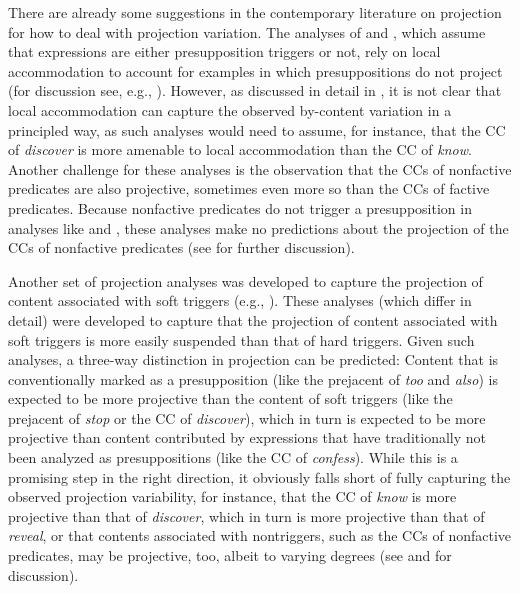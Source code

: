 \documentclass[11pt,fleqn]{article}
\newcommand{\6}{\mbox{$[\hspace*{-.6mm}[$}}
\newcommand{\9}{\mbox{$]\hspace*{-.6mm}]$}}
\begin{document}
There are already some suggestions in the contemporary literature on projection for how to deal with projection variation. The analyses of \citealt{heim83} and \citealt{vds92}, which assume that expressions are either presupposition triggers or not, rely on local accommodation to account for examples in which presuppositions do not project (for discussion see, e.g., \citealt{djaerv-bacovcin2020,mandelkern-etal2020}). However, as discussed in detail in \citealt{tbd-variability}, it is not clear that local accommodation can capture the observed by-content variation in a principled way, as such analyses would need to assume, for instance, that the CC of {\em discover} is more amenable to local accommodation than the CC of {\em know}. Another challenge for these analyses is the observation that the CCs of nonfactive predicates are also projective,  sometimes even more so than the CCs of factive predicates. Because nonfactive predicates do not trigger a presupposition in analyses like \citealt{heim83} and \citealt{vds92}, these analyses make no predictions about the projection of the CCs of nonfactive predicates (see \citealt{degen-tonhauser-language} for further discussion).

Another set of projection analyses was developed to capture the projection of content associated with soft triggers (e.g., \citealt{abusch02,abusch10, abrusan2011,abrusan2016,romoli2015,simons-etal2017}). These analyses (which differ in detail)  were developed to capture that the projection of content associated with soft triggers is more easily suspended than that of hard triggers. Given such analyses, a three-way distinction in projection can be predicted: Content that is conventionally marked as a presupposition (like the prejacent of {\em too} and {\em also}) is expected to be more projective than the content of soft triggers (like the prejacent of {\em stop} or the CC of {\em discover}), which in turn is expected to be more projective than content contributed by expressions that have traditionally not been analyzed as presuppositions (like the CC of {\em confess}). While this is a promising step in the right direction, it obviously falls short of fully capturing the observed projection variability, for instance, that the CC of {\em know} is more projective than that of {\em discover}, which in turn is more projective than that of {\em reveal}, or that contents associated with nontriggers, such as the CCs of nonfactive predicates, may be projective, too, albeit to varying degrees (see \citealt{tbd-variability} and \citealt{degen-tonhauser-language} for discussion). 
\end{document}

